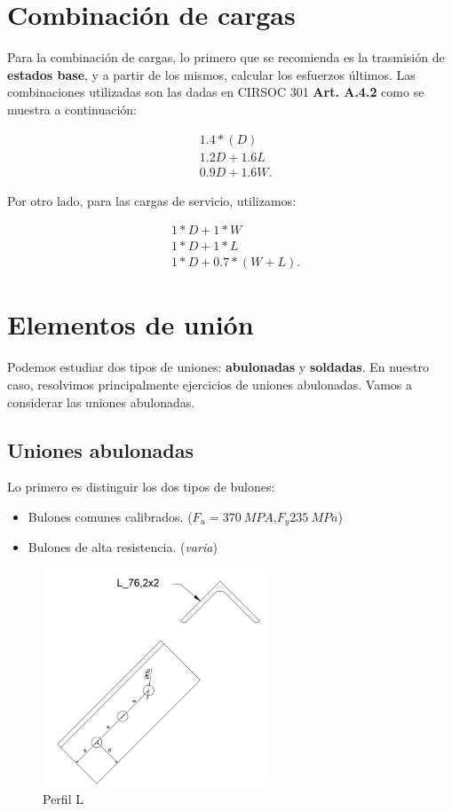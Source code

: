 \documentclass[../main.tex]{subfiles}
\begin{document}
\section{Combinación de cargas}

Para la combinación de cargas, lo primero que se recomienda es la trasmisión
de \textbf{estados base}, y a partir de los mismos, calcular los esfuerzos 
últimos. Las combinaciones utilizadas son las dadas en CIRSOC 301 \textbf{Art. A.4.2}
como se muestra a continuación:

\begin{align*}
  &1.4 * (D) \\[5pt]
  &1.2 D + 1.6 L\\[5pt]
  &0.9 D +  1.6 W 
.\end{align*}

Por otro lado, para las cargas de servicio, utilizamos:

\begin{align*}
  &1*D + 1*W \\[5pt]
  &1*D + 1*L \\[5pt]
  &1*D + 0.7*(W+L) 
.\end{align*}

\section{Elementos de unión}

Podemos estudiar dos tipos de uniones: \textbf{abulonadas} y \textbf{soldadas}.
En nuestro caso, resolvimos principalmente ejercicios de uniones abulonadas.
Vamos a considerar las uniones abulonadas.

\subsection{Uniones abulonadas}

Lo primero es distinguir los dos tipos de bulones:

\begin{itemize}
  \item Bulones comunes calibrados. ($F_u=\SI{370}{MPA}$,$F_y\SI{235}{MPa}$)
  \item Bulones de alta resistencia. (\textit{varia})
\end{itemize}

\begin{figure}[htpb]
  \centering
  \includegraphics[width=0.6\textwidth]{../images/resumen/perfil}
  \caption{Perfil L}
  \label{fig:perfil}
\end{figure}
\end{document}
